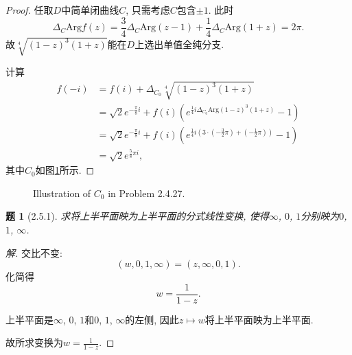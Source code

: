 \documentclass{article}[a4paper, 12pt]
\newtheorem{problem}{题}
\newenvironment{solution}{\begin{proof}[解]}{\end{proof}}
\begin{document}
\begin{proof}
  任取\(D\)中简单闭曲线\(C\), 只需考虑\(C\)包含\(\pm 1\). 此时\[\Delta_C\mathrm{Arg}f(z)=\frac{3}{4}\Delta_C\mathrm{Arg}(z-1)+\frac14\Delta_C\mathrm{Arg}(1+z)=2\pi.\]
  故\(\sqrt[4]{(1-z)^3(1+z)}\)能在\(D\)上选出单值全纯分支.

  计算
  \begin{align*}
    f(-i)&=f(i)+\Delta_{C_0}\sqrt[4]{(1-z)^3(1+z)}\\
    &=\sqrt2e^{-\frac{\pi}{8}i}+f(i)\left(e^{\frac14i\Delta_{C_0}\mathrm{Arg}(1-z)^3(1+z)}-1\right)\\
    &=\sqrt2e^{-\frac{\pi}{8}i}+f(i)\left(e^{\frac14i(3\cdot(-\frac{3}{2}\pi)+(-\frac{1}{2}\pi))}-1\right)\\
    &=\sqrt2e^{\frac{5}{8}\pi i},
  \end{align*}
  其中\(C_0\)如图\ref{fig:2}所示.
\end{proof}

\begin{figure}[htbp]
  \centering
  \caption{Illustration of \(C_0\) in Problem 2.4.27.}
  \label{fig:2}
  \end{figure}

\begin{problem}[2.5.1]
  求将上半平面映为上半平面的分式线性变换, 使得\(\infty\), \(0\), \(1\)分别映为\(0\), \(1\), \(\infty\).
\end{problem}

\begin{solution}
  交比不变:
  \[(w, 0, 1, \infty)=(z,\infty,0,1).\]
  化简得
  \[w=\frac{1}{1-z}.\]

  上半平面是\(\infty\), \(0\), \(1\)和\(0\), \(1\), \(\infty\)的左侧, 因此\(z\mapsto w\)将上半平面映为上半平面.

  故所求变换为\(w=\frac{1}{1-z}\).
\end{solution}
\end{document}

